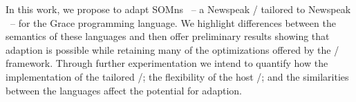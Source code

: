 

%
%
%

% 
%


In this work, we propose to adapt SOMns ~-- a Newspeak \VM/ tailored to Newspeak ~-- for the Grace programming language. We highlight differences between the semantics of these languages and then offer preliminary results showing that adaption is possible while retaining many of the optimizations offered by the \VM/ framework. Through further experimentation we intend to quantify how the implementation of the tailored \VM/; the flexibility of the host \VM/; and the similarities between the languages affect the potential for adaption.

